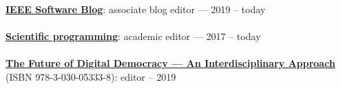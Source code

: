 \href{http://blog.ieeesoftware.org/}{\textbf{IEEE Software Blog}}: associate blog editor --- 2019 -- today
\\ \halfblankline \\
\href{https://www.hindawi.com/journals/sp/}{\textbf{Scientific programming}}: academic editor --- 2017 -- today
\\ \halfblankline \\
\href{https://www.springer.com/gp/book/9783030053321}{\textbf{The Future of Digital Democracy --- An Interdisciplinary Approach}} (ISBN 978-3-030-05333-8): editor -- 2019

